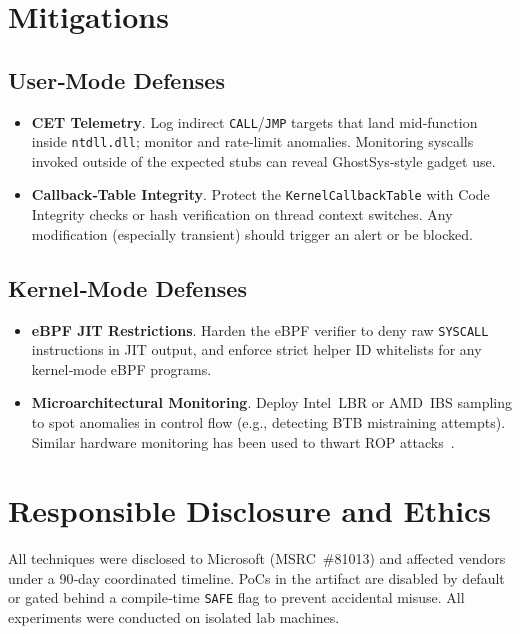 \documentclass[11pt,letterpaper]{article}
\begin{document}
\section{Mitigations}
\label{sec:mitigations}
\subsection{User‑Mode Defenses}
\begin{itemize}
  \item \textbf{CET Telemetry}. Log indirect \texttt{CALL}/\texttt{JMP} targets that land mid‑function inside \texttt{ntdll.dll}; monitor and rate‑limit anomalies. Monitoring syscalls invoked outside of the expected stubs can reveal GhostSys‑style gadget use.
  \item \textbf{Callback‑Table Integrity}. Protect the \texttt{KernelCallbackTable} with Code Integrity checks or hash verification on thread context switches. Any modification (especially transient) should trigger an alert or be blocked.
\end{itemize}

\subsection{Kernel‑Mode Defenses}
\begin{itemize}
  \item \textbf{eBPF JIT Restrictions}. Harden the eBPF verifier to deny raw \texttt{SYSCALL} instructions in JIT output, and enforce strict helper ID whitelists for any kernel‑mode eBPF programs.
  \item \textbf{Microarchitectural Monitoring}. Deploy Intel LBR or AMD IBS sampling to spot anomalies in control flow (e.g., detecting BTB mistraining attempts). Similar hardware monitoring has been used to thwart ROP attacks~\cite{Pappas2013}.
\end{itemize}

\section{Responsible Disclosure and Ethics}
\label{sec:ethics}
All techniques were disclosed to Microsoft (MSRC \#81013) and affected vendors under a 90‑day coordinated timeline. PoCs in the artifact are disabled by default or gated behind a compile‑time \texttt{SAFE} flag to prevent accidental misuse. All experiments were conducted on isolated lab machines.
\end{document}
